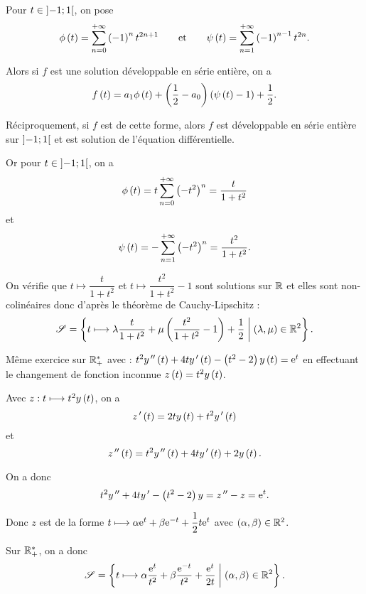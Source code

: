 \begin{corr}
Pour \(t\in\left]-1;1\right[\), on pose \[\phi\left(t\right)=\sum_{n=0}^{+\infty}\left(-1\right)^nt^{2n+1}\qquad\text{et}\qquad\psi\left(t\right)=\sum_{n=1}^{+\infty}\left(-1\right)^{n-1}t^{2n}.\]

Alors si \(f\) est une solution développable en série entière, on a \[f\left(t\right)=a_1\phi\left(t\right)+\left(\dfrac{1}{2}-a_0\right)\left(\psi\left(t\right)-1\right)+\dfrac{1}{2}.\]

Réciproquement, si \(f\) est de cette forme, alors \(f\) est développable en série entière sur \(\left]-1;1\right[\) et est solution de l'équation différentielle.

Or pour \(t\in\left]-1;1\right[\), on a \[\phi\left(t\right)=t\sum_{n=0}^{+\infty}\left(-t^2\right)^n=\dfrac{t}{1+t^2}\] et \[\psi\left(t\right)=-\sum_{n=1}^{+\infty}\left(-t^2\right)^n=\dfrac{t^2}{1+t^2}.\]

On vérifie que \(t\mapsto\dfrac{t}{1+t^2}\) et \(t\mapsto\dfrac{t^2}{1+t^2}-1\) sont solutions sur \(\mathbb{R}\) et elles sont non-colinéaires donc d'après le théorème de Cauchy-Lipschitz : \[\mathscr{S}=\left\lbrace t\longmapsto\lambda\dfrac{t}{1+t^2}+\mu\left(\dfrac{t^2}{1+t^2}-1\right)+\dfrac{1}{2}\;\middle|\;\left(\lambda,\mu\right)\in\mathbb{R}^2\right\rbrace.\]
\end{corr}

\begin{exo}
Même exercice sur \(\mathbb{R}_+^*\) avec : \(t^2y^{\,\prime\prime}\left(t\right)+4ty^{\,\prime}\left(t\right)-\left(t^2-2\right)y\left(t\right)=\mathrm{e}^{t}\) en effectuant le changement de fonction inconnue \(z\left(t\right)=t^2y\left(t\right)\).
\end{exo}

\begin{corr}
Avec \(z:t\longmapsto t^2y\left(t\right)\), on a \[z^{\,\prime}\left(t\right)=2ty\left(t\right)+t^2y^{\,\prime}\left(t\right)\] et \[z^{\,\prime\prime}\left(t\right)=t^2y^{\,\prime\prime}\left(t\right)+4ty^{\,\prime}\left(t\right)+2y\left(t\right).\]

On a donc \[t^2y^{\,\prime\prime}+4ty^{\,\prime}-\left(t^2-2\right)y=z^{\,\prime\prime}-z=\mathrm{e}^{t}.\]

Donc \(z\) est de la forme \(t\longmapsto\alpha\mathrm{e}^{t}+\beta\mathrm{e}^{-t}+\dfrac{1}{2}t\mathrm{e}^{t}\) avec \(\left(\alpha,\beta\right)\in\mathbb{R}^2\).

Sur \(\mathbb{R}_+^*\), on a donc \[\mathscr{S}=\left\lbrace t\longmapsto\alpha\dfrac{\mathrm{e}^{t}}{t^2}+\beta\dfrac{\mathrm{e}^{-t}}{t^2}+\dfrac{\mathrm{e}^{t}}{2t}\;\middle|\;\left(\alpha,\beta\right)\in\mathbb{R}^2\right\rbrace.\]
\end{corr}

